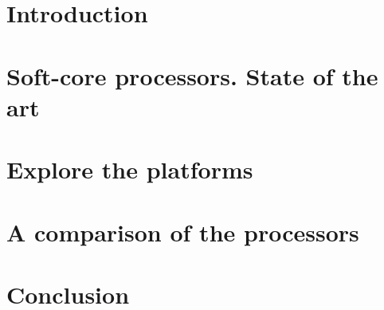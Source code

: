 \documentclass[twoside]{romjist}
\begin{document}
\maketitle




\section{Introduction}



\section{Soft-core processors. State of the art}


\section{Explore the platforms}


\section{A comparison of the processors}


\section{Conclusion}




% 

\printbibliography
\end{document}
